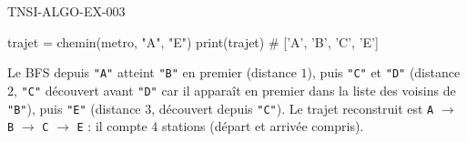 \begin{corrige}{TNSI-ALGO-EX-003}
\begin{python}
trajet = chemin(metro, "A", "E")
print(trajet)  # ['A', 'B', 'C', 'E']
\end{python}
Le BFS depuis \texttt{"A"} atteint \texttt{"B"} en premier (distance $1$), puis \texttt{"C"} et \texttt{"D"} (distance $2$, \texttt{"C"} découvert avant \texttt{"D"} car il apparaît en premier dans la liste des voisins de \texttt{"B"}), puis \texttt{"E"} (distance $3$, découvert depuis \texttt{"C"}). Le trajet reconstruit est \texttt{A} $\to$ \texttt{B} $\to$ \texttt{C} $\to$ \texttt{E} : il compte $4$ stations (départ et arrivée compris).
\end{corrige}
